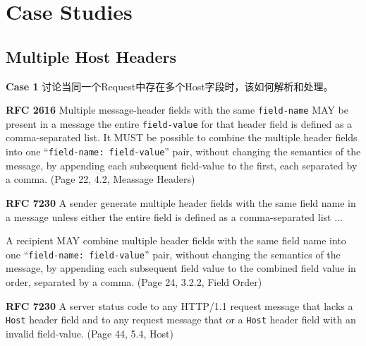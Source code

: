 \section{Case Studies}
\subsection{Multiple Host Headers}

\textbf{Case 1} 讨论当同一个Request中存在多个Host字段时，该如何解析和处理。
\vspace{1ex}

\begin{spacing}{0.8}
	\begin{tcolorbox}
	
		\textbf{RFC 2616}
		Multiple message-header fields with the same \texttt{field-name} MAY be present in a message {\color{red}{ if and only if (隐晦地说明Multiple Host是不允许的)}} the entire \texttt{field-value} for that header field is defined as a comma-separated list. It MUST be possible to combine the multiple header fields into one ``\texttt{field-name: field-value}'' pair, without changing the semantics of the message, by appending each subsequent field-value to the first, each separated by a comma. (Page 22, 4.2, Meassage Headers)
	\end{tcolorbox}
\end{spacing} 

\vspace{1ex}

\begin{spacing}{0.8}
		\begin{tcolorbox}
		\textbf{RFC 7230} 
		A sender {\color{red}{MUST NOT}} generate multiple header fields with the same field name in a message unless either the entire field is defined  as a comma-separated list ...
	
		A recipient MAY combine multiple header fields with the same field name into one ``\texttt{field-name: field-value}'' pair, without changing the semantics of the message, by appending each subsequent field value to the combined field value in order, separated by a comma. (Page 24, 3.2.2, Field Order)
	\end{tcolorbox}
\end{spacing}

\vspace{1ex}

\begin{spacing}{0.8}
	\begin{tcolorbox}
		\textbf{RFC 7230}
		A server {\color{red}{MUST respond with a 400 (Bad Request)}} status code to any HTTP/1.1 request message that lacks a \texttt{Host} header field and to any request message that {} or a \texttt{Host} header field with an invalid field-value. (Page 44, 5.4,  Host)
	\end{tcolorbox}
\end{spacing}

